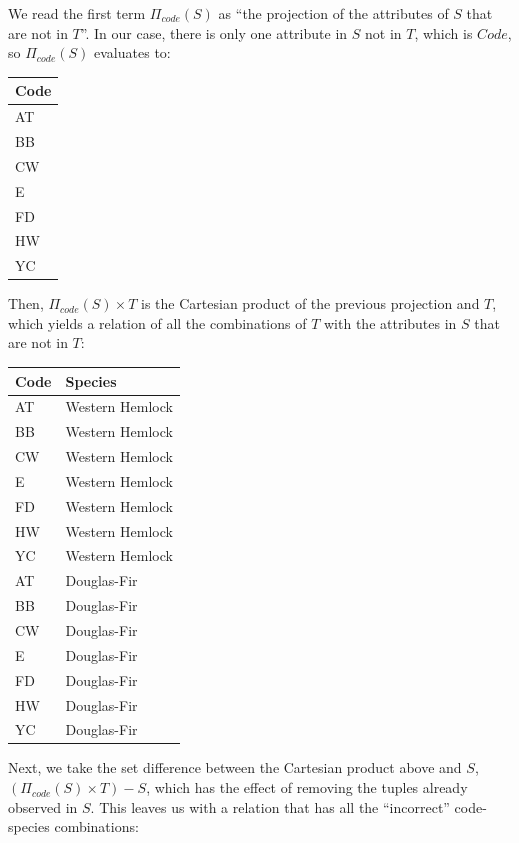 \documentclass[
]{book}
\begin{document}
We read the first term \(Π_{code}(S)\) as ``the projection of the attributes of \(S\) that are not in \(T\)''. In our case, there is only one attribute in \(S\) not in \(T\), which is \(Code\), so \(Π_{code}(S)\) evaluates to:

\begin{tabular}{l}
\toprule
Code\\
\midrule
AT\\
BB\\
CW\\
E\\
FD\\
\addlinespace
HW\\
YC\\
\bottomrule
\end{tabular}

Then, \(Π_{code}(S)×T\) is the Cartesian product of the previous projection and \(T\), which yields a relation of all the combinations of \(T\) with the attributes in \(S\) that are not in \(T\):

\begin{tabular}{ll}
\toprule
Code & Species\\
\midrule
AT & Western Hemlock\\
BB & Western Hemlock\\
CW & Western Hemlock\\
E & Western Hemlock\\
FD & Western Hemlock\\
\addlinespace
HW & Western Hemlock\\
YC & Western Hemlock\\
AT & Douglas-Fir\\
BB & Douglas-Fir\\
CW & Douglas-Fir\\
\addlinespace
E & Douglas-Fir\\
FD & Douglas-Fir\\
HW & Douglas-Fir\\
YC & Douglas-Fir\\
\bottomrule
\end{tabular}

Next, we take the set difference between the Cartesian product above and \(S\), \((Π_{code}(S)×T)-S\), which has the effect of removing the tuples already observed in \(S\). This leaves us with a relation that has all the ``incorrect'' code-species combinations:
\end{document}
